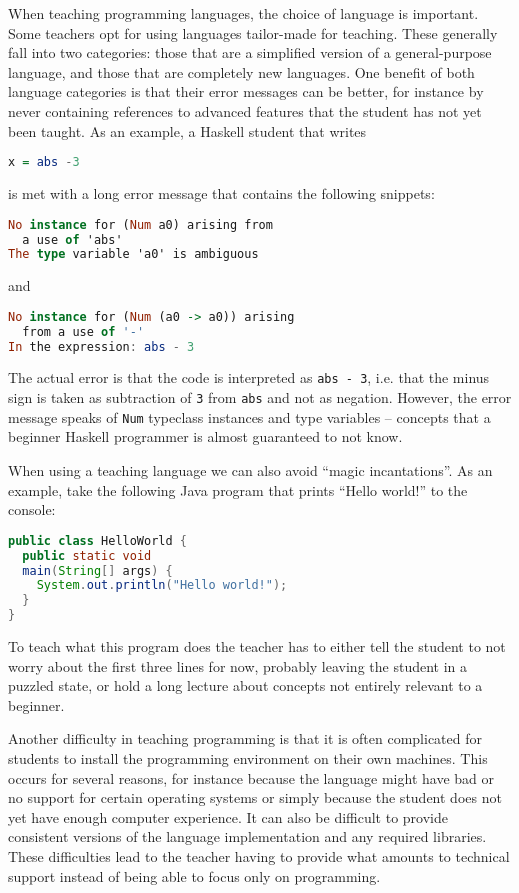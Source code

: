 When teaching programming languages, the choice of language is important.  Some
teachers opt for using languages tailor-made for teaching. These generally fall
into two categories: those that are a simplified version of a general-purpose
language, and those that are completely new languages. One benefit of both
language categories is that their error messages can be better, for instance by
never containing references to advanced features that the student has not yet
been taught. As an example, a Haskell student that writes
\begin{lstlisting}[language=Haskell, basicstyle=\footnotesize]
x = abs -3
\end{lstlisting}
is met with a long error message that contains the following snippets:
\begin{lstlisting}[language=Haskell, basicstyle=\footnotesize]
No instance for (Num a0) arising from
  a use of 'abs'
The type variable 'a0' is ambiguous
\end{lstlisting}
and
\begin{lstlisting}[language=Haskell, basicstyle=\footnotesize]
No instance for (Num (a0 -> a0)) arising
  from a use of '-'
In the expression: abs - 3
\end{lstlisting}
The actual error is that the code is interpreted as \texttt{abs - 3}, i.e.
that the minus sign is taken as subtraction of \texttt{3} from \texttt{abs} and
not as negation.  However, the error message speaks of \texttt{Num} typeclass
instances and type variables -- concepts that a beginner Haskell programmer is
almost guaranteed to not know.

When using a teaching language we can also avoid ``magic incantations''. As an
example, take the following Java program that prints ``Hello world!'' to the
console:
\begin{lstlisting}[language=Java, basicstyle=\footnotesize]
public class HelloWorld {
  public static void
  main(String[] args) {
    System.out.println("Hello world!");
  }
}
\end{lstlisting}
To teach what this program does the teacher has to either tell the student to
not worry about the first three lines for now, probably leaving the student in
a puzzled state, or hold a long lecture about concepts not entirely relevant to
a beginner.

Another difficulty in teaching programming is that it is often complicated for
students to install the programming environment on their own machines. This
occurs for several reasons, for instance because the language might have bad or
no support for certain operating systems or simply because the student does not
yet have enough computer experience. It can also be difficult to provide
consistent versions of the language implementation and any required libraries.
These difficulties lead to the teacher having to provide what amounts to
technical support instead of being able to focus only on programming.
